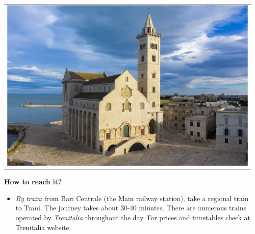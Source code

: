 \documentclass[
	openany, %
	parskip=full, %
	12pt, %
	a4paper, %
]{conferencebooklet} %
\newcommand\smallbull{\scaleobj{0.7}{\blacksquare}}
\newcommand\itema{\item[\textcolor{case_blue}{$\smallbull$}]}
\begin{document}
\begin{adjustwidth}{10pt}{20pt}
\begin{table}[h!]
{\begin{tabular}{p{60mm}}
            \centering
            \includegraphics[width=\linewidth]{images/useful_info/puglia/trani.jpg}
        \end{tabular}
            }
\end{table}
\vspace{-3mm}
\textbf{How to reach it?}
\vspace{-5mm}
\begin{itemize}[leftmargin=*, noitemsep]
    \itema \textit{By train}: from Bari Centrale (the Main railway station), take a regional train to Trani. The journey takes about 30-40 minutes. There are numerous trains operated by \color{blue}\href{https://www.trenitalia.com/en.html}{\textit{Trenitalia}} \color{black} throughout the day. For prices and timetables check at Trenitalia website.
\end{itemize}

\vspace{3mm}
\begin{table}[h!]
\end{table}
\end{adjustwidth}
\end{document}
